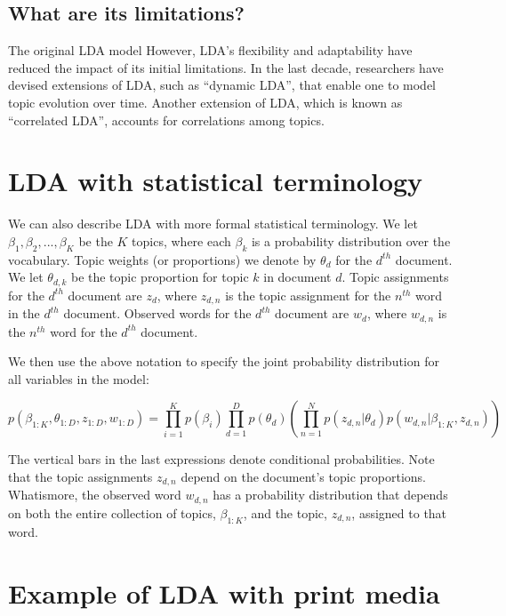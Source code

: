 \documentclass[12pt,]{article}
\begin{document}
\subsection{What are its limitations?}\label{what-are-its-limitations}

The original LDA model However, LDA's flexibility and adaptability have
reduced the impact of its initial limitations. In the last decade,
researchers have devised extensions of LDA, such as ``dynamic LDA'',
that enable one to model topic evolution over time. Another extension of
LDA, which is known as ``correlated LDA'', accounts for correlations
among topics.

\section{LDA with statistical
terminology}\label{lda-with-statistical-terminology}

We can also describe LDA with more formal statistical terminology. We
let \(\beta_1, \beta_2, ..., \beta_K\) be the \(K\) topics, where each
\(\beta_k\) is a probability distribution over the vocabulary. Topic
weights (or proportions) we denote by \(\theta_d\) for the \(d^{th}\)
document. We let \(\theta_{d,k}\) be the topic proportion for topic
\(k\) in document \(d\). Topic assignments for the \(d^{th}\) document
are \(z_d\), where \(z_{d,n}\) is the topic assignment for the
\(n^{th}\) word in the \(d^{th}\) document. Observed words for the
\(d^{th}\) document are \(w_d\), where \(w_{d, n}\) is the \(n^{th}\)
word for the \(d^{th}\) document.

We then use the above notation to specify the joint probability
distribution for all variables in the model:

\[p(\beta_{1:K}, \theta_{1:D}, z_{1:D}, w_{1:D}) = \prod_{i = 1}^Kp(\beta_i)\prod_{d = 1}^Dp(\theta_d)\left( \prod_{n = 1}^N p(z_{d,n}|\theta_d)p(w_{d,n}|\beta_{1:K}, z_{d,n})\right)\]

The vertical bars in the last expressions denote conditional
probabilities. Note that the topic assignments \(z_{d,n}\) depend on the
document's topic proportions. Whatismore, the observed word \(w_{d,n}\)
has a probability distribution that depends on both the entire
collection of topics, \(\beta_{1:K}\), and the topic, \(z_{d,n}\),
assigned to that word.

\section{Example of LDA with print
media}\label{example-of-lda-with-print-media}
\end{document}
